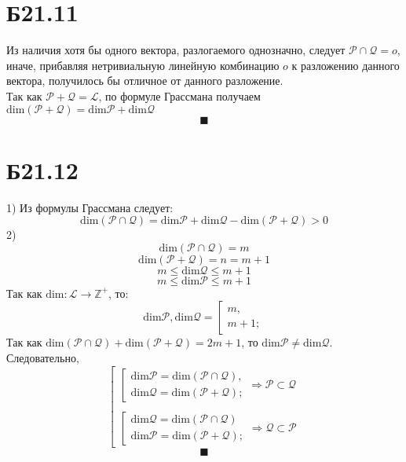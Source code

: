 \documentclass[a4paper,12pt]{article} %
\begin{document}
\section*{Б21.11}
Из наличия хотя бы одного вектора, разлогаемого однозначно, следует $\mathcal{P}\cap\mathcal{Q}=o$, иначе, прибавляя нетривиальную линейную комбинацию $o$ к разложению данного вектора, получилось бы отличное от данного разложение.\\
Так как $\mathcal{P}+\mathcal{Q}=\mathcal{L}$, по формуле Грассмана получаем $\mathrm{dim}\left(\mathcal{P}+\mathcal{Q}\right)=\mathrm{dim}\mathcal{P}+\mathrm{dim}\mathcal{Q}$\\
$$\blacksquare$$
\section*{Б21.12}
1) Из формулы Грассмана следует:\\
$$\mathrm{dim}\left(\mathcal{P}\cap\mathcal{Q}\right)=\mathrm{dim}\mathcal{P}+\mathrm{dim}\mathcal{Q}-\mathrm{dim}\left(\mathcal{P}+\mathcal{Q}\right)>0$$
2) $$\mathrm{dim}\left(\mathcal{P}\cap\mathcal{Q}\right)=m$$
$$\mathrm{dim}\left(\mathcal{P}+\mathcal{Q}\right)=n=m+1$$
$$m\leq\mathrm{dim}\mathcal{Q}\leq m+1$$
$$m\leq\mathrm{dim}\mathcal{P}\leq m+1$$
Так как $\mathrm{dim}:\mathcal{L}\to\mathbb{Z}^{+}$, то:
$$\mathrm{dim}\mathcal{P}, \mathrm{dim}\mathcal{Q}=\left[\begin{matrix}
    m,\\
    m+1;
\end{matrix}\right.$$
Так как $\mathrm{dim}\left(\mathcal{P}\cap\mathcal{Q}\right)+\mathrm{dim}\left(\mathcal{P}+\mathcal{Q}\right)=2m+1$, то $\mathrm{dim}\mathcal{P}\neq\mathrm{dim}\mathcal{Q}$.
Следовательно,
$$\left[\begin{matrix}
    \left[\begin{matrix}
    \mathrm{dim}\mathcal{P}=\mathrm{dim}\left(\mathcal{P}\cap\mathcal{Q}\right),\\
    \mathrm{dim}\mathcal{Q}=\mathrm{dim}\left(\mathcal{P}+\mathcal{Q}\right);
\end{matrix}\right.\Rightarrow \mathcal{P}\subset\mathcal{Q}\\
\\
    \left[\begin{matrix}
    \mathrm{dim}\mathcal{Q}=\mathrm{dim}\left(\mathcal{P}\cap\mathcal{Q}\right)\\
    \mathrm{dim}\mathcal{P}=\mathrm{dim}\left(\mathcal{P}+\mathcal{Q}\right);
\end{matrix}\right.\Rightarrow \mathcal{Q}\subset\mathcal{P}
\end{matrix}\right.$$
$$\blacksquare$$
\end{document}
